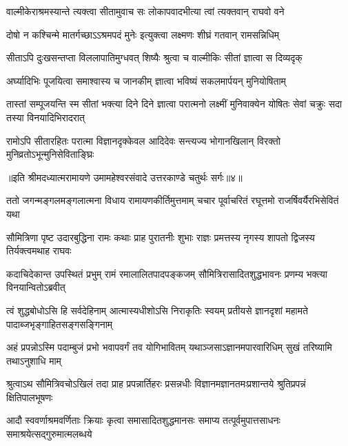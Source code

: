 \twolineshloka
{वाल्मीकेराश्रमस्यान्ते त्यक्त्वा सीतामुवाच सः}
{लोकापवादभीत्या त्वां त्यक्तवान् राघवो वने} %

\twolineshloka
{दोषो न कश्चिन्मे मातर्गच्छाऽऽश्रमपदं मुनेः}
{इत्युक्त्वा लक्ष्मणः शीघ्रं गतवान् रामसन्निधिम्} %

\twolineshloka
{सीताऽपि दुःखसन्तप्ता विललापातिमुग्धवत्}
{शिष्यैः श्रुत्वा च वाल्मीकिः सीतां ज्ञात्वा स दिव्यदृक्} %

\twolineshloka
{अर्घ्यादिभिः पूजयित्वा समाश्वास्य च जानकीम्}
{ज्ञात्वा भविष्यं सकलमार्पयन् मुनियोषिताम्} %

\threelineshloka
{तास्तां सम्पूजयन्ति स्म सीतां भक्त्या दिने दिने}
{ज्ञात्वा परात्मनो लक्ष्मीं मुनिवाक्येन योषितः}
{सेवां चक्रुः सदा तस्या विनयादिभिरादरात्} %

\fourlineindentedshloka
{रामोऽपि सीतारहितः परात्मा}
{विज्ञानदृक्केवल आदिदेवः}
{सन्त्यज्य भोगानखिलान् विरक्तो}
{मुनिव्रतोऽभून्मुनिसेविताङ्घ्रिः} %

{॥इति श्रीमदध्यात्मरामायणे उमामहेश्वरसंवादे उत्तरकाण्डे
चतुर्थः सर्गः॥४॥
}





\fourlineindentedshloka
{ततो जगन्मङ्गलमङ्गलात्मना}
{विधाय रामायणकीर्तिमुत्तमाम्}
{चचार पूर्वाचरितं रघूत्तमो}
{राजर्षिवर्यैरभिसेवितं यथा} %

\fourlineindentedshloka
{सौमित्रिणा पृष्ट उदारबुद्धिना}
{रामः कथाः प्राह पुरातनीः शुभाः}
{राज्ञः प्रमत्तस्य नृगस्य शापतो}
{द्विजस्य तिर्यक्त्वमथाह राघवः} %

\fourlineindentedshloka
{कदाचिदेकान्त उपस्थितं प्रभुम्}
{रामं रमालालितपादपङ्कजम्}
{सौमित्रिरासादितशुद्धभावनः}
{प्रणम्य भक्त्या विनयान्वितोऽब्रवीत्} %

\fourlineindentedshloka
{त्वं शुद्धबोधोऽसि हि सर्वदेहिनाम्}
{आत्मास्यधीशोऽसि निराकृतिः स्वयम्}
{प्रतीयसे ज्ञानदृशां महामते}
{पादाब्जभृङ्गाहितसङ्गसङ्गिनाम्} %

\fourlineindentedshloka
{अहं प्रपन्नोऽस्मि पदाम्बुजं प्रभो}
{भवापवर्गं तव योगिभावितम्}
{यथाञ्जसाऽज्ञानमपारवारिधिम्}
{सुखं तरिष्यामि तथाऽनुशाधि माम्} %

\fourlineindentedshloka
{श्रुत्वाऽथ सौमित्रिवचोऽखिलं तदा}
{प्राह प्रपन्नार्तिहरः प्रसन्नधीः}
{विज्ञानमज्ञानतमःप्रशान्तये}
{श्रुतिप्रपन्नं क्षितिपालभूषणः} %

\fourlineindentedshloka
{आदौ स्ववर्णाश्रमवर्णिताः क्रियाः}
{कृत्वा समासादितशुद्धमानसः}
{समाप्य तत्पूर्वमुपात्तसाधनः}
{समाश्रयेत्सद्गुरुमात्मलब्धये} %

